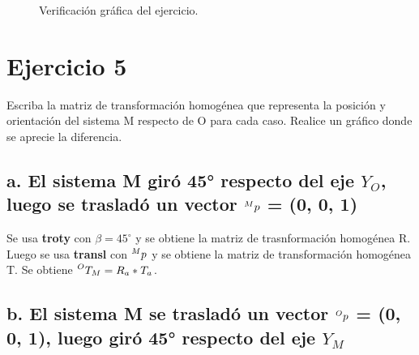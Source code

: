 \documentclass[a4paper,12pt]{article}
\begin{document}
\begin{figure}[H]
    \centering
    \begin{adjustbox}{scale = 0.85, max width=\columnwidth}
    \end{adjustbox}
    \caption{Verificación gráfica del ejercicio.}
\end{figure}

\section{Ejercicio 5}
Escriba la matriz de transformación homogénea que representa la posición y
orientación del sistema {M} respecto de {O} para cada caso. Realice un gráfico donde se
aprecie la diferencia.

\subsection{a. El sistema {M} giró 45° respecto del eje $Y_O$, luego se trasladó un vector $\prescript{M}{}{p}$ = (0, 0, 1)}

Se usa \textbf{troty} con $\beta = 45^\circ$ y se obtiene la matriz de trasnformación homogénea R.
Luego se usa \textbf{transl} con $\prescript{M}{}{p}$ y se obtiene la matriz de transformación homogénea T.
Se obtiene $\prescript{O}{}{T_M} = R_a*T_a$.

\subsection{b. El sistema {M} se trasladó un vector  $\prescript{O}{}{p}$ = (0, 0, 1), luego giró 45° respecto del eje $Y_M$}
\end{document}
